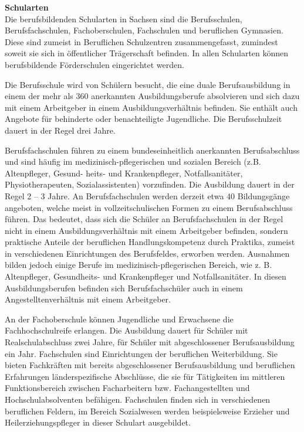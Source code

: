 \textbf{Schularten}\\
Die berufsbildenden Schularten in Sachsen sind die Berufsschulen, Berufsfachschulen, Fachoberschulen, Fachschulen und beruflichen Gymnasien. Diese sind zumeist in Beruflichen Schulzentren zusammengefasst, zumindest soweit sie sich in öffentlicher Trägerschaft befinden. In allen Schularten können berufsbildende Förderschulen eingerichtet werden.

Die Berufsschule wird von Schülern besucht, die eine duale Berufsausbildung in einem der mehr als 360 anerkannten Ausbildungsberufe absolvieren und sich dazu mit einem Arbeitgeber in einem Ausbildungsverhältnis befinden. Sie enthält auch Angebote für behinderte oder benachteiligte Jugendliche. Die Berufsschulzeit dauert in der Regel drei Jahre. 

Berufsfachschulen führen zu einem bundeseinheitlich anerkannten Berufsabschluss und sind häufig im medizinisch-pflegerischen und sozialen Bereich (z.B. Altenpfleger, Gesund- heits- und Krankenpfleger, Notfallsanitäter, Physiotherapeuten, Sozialassistenten) vorzufinden. Die Ausbildung dauert in der Regel 2 -- 3 Jahre. An Berufsfachschulen werden derzeit etwa 40 Bildungsgänge angeboten, welche meist in vollzeitschulischen Formen zu einem Berufsabschluss führen. Das bedeutet, dass sich die Schüler an Berufsfachschulen in der Regel nicht in einem Ausbildungsverhältnis mit einem Arbeitgeber befinden, sondern praktische Anteile der beruflichen Handlungskompetenz durch Praktika, zumeist in verschiedenen Einrichtungen des Berufsfeldes, erworben werden. Ausnahmen bilden jedoch einige Berufe im medizinisch-pflegerischen Bereich, wie z. B. Altenpfleger, Gesundheits- und Krankenpfleger und Notfallsanitäter. In diesen Ausbildungsberufen befinden sich Berufsfachschüler auch in einem Angestelltenverhältnis mit einem Arbeitgeber.
 
An der Fachoberschule können Jugendliche und Erwachsene die Fachhochschulreife erlangen. Die Ausbildung dauert für Schüler mit Realschulabschluss zwei Jahre, für Schüler mit abgeschlossener Berufsausbildung ein Jahr. 
Fachschulen sind Einrichtungen der beruflichen Weiterbildung. Sie bieten Fachkräften mit bereits abgeschlossener Berufsausbildung und beruflichen Erfahrungen länderspezifische Abschlüsse, die sie für Tätigkeiten im mittleren Funktionsbereich zwischen Facharbeitern bzw. Fachangestellten und Hochschulabsolventen befähigen. Fachschulen finden sich in verschiedenen beruflichen Feldern, im Bereich Sozialwesen werden beispielsweise Erzieher und Heilerziehungspfleger in dieser Schulart ausgebildet. 
 
